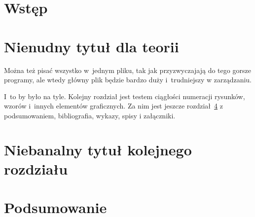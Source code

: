 \chapter{Wstęp}


\chapter{Nienudny tytuł dla teorii}
Można też pisać wszystko w~jednym pliku, tak jak przyzwyczajają do tego gorsze programy, ale wtedy główny plik będzie bardzo duży i~trudniejszy w zarządzaniu.

I~to by było na tyle. Kolejny rozdział jest testem ciągłości numeracji rysunków, wzorów i~innych elementów graficznych. Za nim jest jeszcze rozdział~\ref{ch:podsumowanie} z podsumowaniem, bibliografia, wykazy, spisy i załączniki.

%
%

\chapter{Niebanalny tytuł kolejnego rozdziału}


\chapter{Podsumowanie}
\label{ch:podsumowanie}

